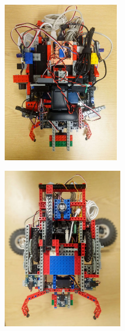 \begin{figure}[ht]
    \centering
    \begin{subfigure}{0.45\textwidth}
        \includegraphics[width=\linewidth, height=7cm]{res/robot-pics/view-top.jpg}
        \caption{}
        \label{fig:}
    \end{subfigure}
    \begin{subfigure}{0.45\textwidth}
        \includegraphics[width=\linewidth, height=7cm]{res/robot-pics/view-bottom.jpg}
        \caption{}
        \label{fig:}
    \end{subfigure}
    \caption{}
    \label{fig:}
\end{figure}

